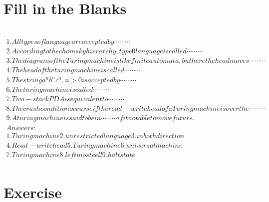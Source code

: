 \documentclass{book}
\begin{document}
\chapter{Fill in the Blanks}\\
\begin{align}

1. All types of language are accepted by\cdots\cdots\cdots\\
2. According to the chomsky hierarchy, type 0 language is called\cdots\cdots\cdots\\
3. The diagram of the Turing machine is like finite automata, but here the head moves\cdots\cdots\cdots\\
4. The head of the turing machine is called\cdots\cdots\cdots\\
5. The string a^{n}b^{n}c^{n}, n>0 is accepted by \cdots\cdots\cdots\\
6. The turing machine is called\cdots\cdots\cdots\\
7. Two-stack PDA is equivalent to\cdots\cdots\cdots\\
8. The crash condition occurse if the read-write head of a Turing machine is over the\cdots\cdots\cdots\\
9. A turing machine is said to be in \cdots\cdots\cdots if it not able to move future.\\

Answers:\\

1. Turing machine			2. 	unrestricted language			3. in both direction\\
4. Read-write head		5. Turing machine						6. universal machine\\
7. Turing machine			8. leftmost cell							9. halt state\\
\end{align}

\chapter{Exercise}\\
\end{document}
